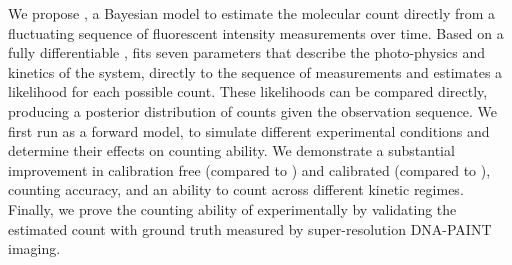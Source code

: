 We propose \ours, a Bayesian model to estimate the molecular count
directly from a fluctuating sequence of fluorescent intensity measurements over
time.
  Based on a fully differentiable \hmm, \ours fits
  seven parameters that describe the photo-physics and kinetics of the system, 
  directly to the sequence of measurements and
  estimates a likelihood for each possible count.
  These likelihoods can be compared directly, producing a posterior
  distribution of counts given the observation sequence.
  We first run \ours as a forward model, to simulate
  different experimental conditions and determine their effects on counting ability.
  We demonstrate a substantial improvement in calibration free (compared to \lbfcs) 
  and calibrated (compared to \qpaint), counting accuracy, and 
  an ability to count across different kinetic regimes.
  Finally, we prove the counting ability of \ours experimentally by validating 
  the estimated count with ground truth measured by super-resolution DNA-PAINT imaging.
